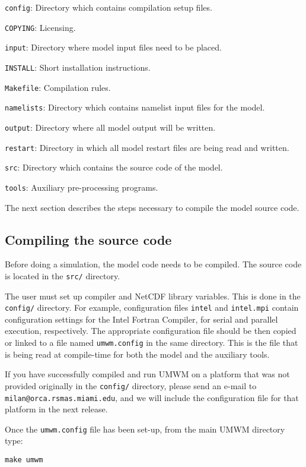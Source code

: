 \documentclass[letterpaper]{article}
\numberwithin{equation}{section}
\begin{document}
\verb+config+: Directory which contains compilation setup files.

\verb+COPYING+: Licensing.

\verb+input+: Directory where model input files need to be placed.

\verb+INSTALL+: Short installation instructions.

\verb+Makefile+: Compilation rules.

\verb+namelists+: Directory which contains namelist input files for the model.

\verb+output+: Directory where all model output will be written.

\verb+restart+: Directory in which all model restart files are being read and written.

\verb+src+: Directory which contains the source code of the model.

\verb+tools+: Auxiliary pre-processing programs.

The next section describes the steps necessary to compile the model source code.

\subsection{Compiling the source code}
\label{sec:compilation}

Before doing a simulation, the model code needs to be compiled.
The source code is located in the \verb+src/+ directory.

The user must set up compiler and NetCDF library variables.
This is done in the \verb+config/+ directory.
For example, configuration files \verb+intel+ and \verb+intel.mpi+
contain configuration settings for the Intel Fortran Compiler,
for serial and parallel execution, respectively.
The appropriate configuration file should be then copied or linked
to a file named \verb+umwm.config+ in the same directory.
This is the file that is being read at compile-time for both the model
and the auxiliary tools.

If you have successfully compiled and run UMWM on a platform that was
not provided originally in the \verb+config/+ directory, please
send an e-mail to \verb+milan@orca.rsmas.miami.edu+, and we will
include the configuration file for that platform in the next release.

Once the \verb+umwm.config+ file has been set-up, from the main UMWM directory type:

\begin{verbatim}
make umwm
\end{verbatim}
\end{document}
